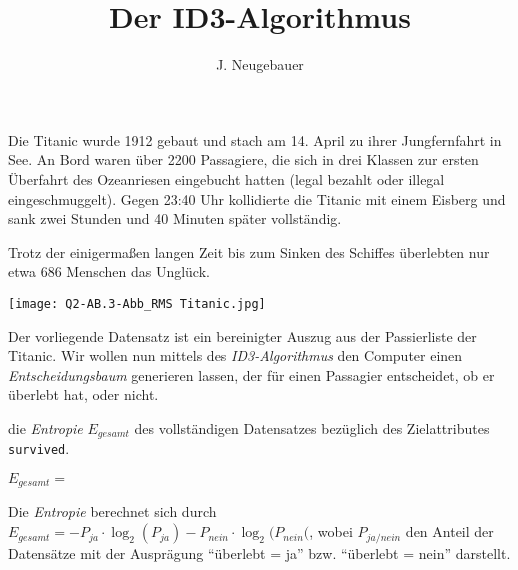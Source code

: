 \documentclass[10pt, a4paper]{scrartcl}
\author{J. Neugebauer}
\title{Der ID3-Algorithmus}
\date{\Heute}
\begin{document}
\ReiheTitel

\begin{rahmen}\small
	\begin{minipage}{0.69\textwidth}
		Die Titanic wurde 1912 gebaut und stach am 14. April zu ihrer Jungfernfahrt in See. An Bord waren über 2200 Passagiere, die sich in drei Klassen zur ersten Überfahrt des Ozeanriesen eingebucht hatten (legal bezahlt oder illegal eingeschmuggelt). Gegen 23:40 Uhr kollidierte die Titanic mit einem Eisberg und sank zwei Stunden und 40 Minuten später vollständig.
		
		Trotz der einigermaßen langen Zeit bis zum Sinken des Schiffes überlebten nur etwa 686 Menschen das Unglück.
	\end{minipage} \hfill
	\begin{minipage}{0.3\textwidth}
		\begin{center}
			\texttt{[image: Q2-AB.3-Abb\_RMS Titanic.jpg]}
		\end{center}
	\end{minipage}
\end{rahmen}
\bigskip

Der vorliegende Datensatz ist ein bereinigter Auszug aus der Passierliste der Titanic. Wir wollen nun mittels des \emph{ID3-Algorithmus} den Computer einen \emph{Entscheidungsbaum} generieren lassen, der für einen Passagier entscheidet, ob er überlebt hat, oder nicht.

\begin{aufgabe}
	 die \emph{Entropie} $E_{gesamt}$ des vollständigen Datensatzes bezüglich des Zielattributes 
	\texttt{survived}.
	
	\begin{center}
		$E_{gesamt} = $\linie[12cm]
	\end{center}
		
	\begin{infobox}
		Die \emph{Entropie} berechnet sich durch $E_{gesamt} = -P_{ja}\cdot \log_2{(P_{ja})} -P_{nein}\cdot \log_2{(P_{nein}(}$, wobei $P_{ja/nein}$ den Anteil der Datensätze mit der Ausprägung \enquote{überlebt = ja} bzw. \enquote{überlebt = nein} darstellt.
	\end{infobox}
\end{aufgabe}
\end{document}
